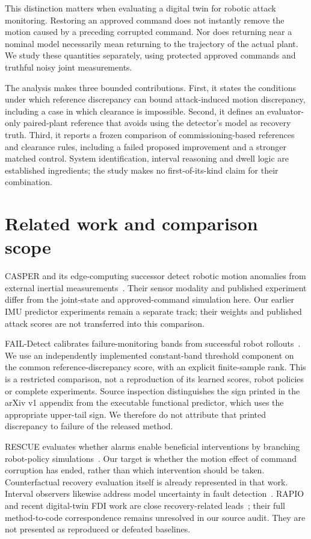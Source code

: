 \documentclass[11pt]{article}
\begin{document}
This distinction matters when evaluating a digital twin for robotic attack monitoring. Restoring an approved command does not instantly remove the motion caused by a preceding corrupted command. Nor does returning near a nominal model necessarily mean returning to the trajectory of the actual plant. We study these quantities separately, using protected approved commands and truthful noisy joint measurements.

The analysis makes three bounded contributions. First, it states the conditions under which reference discrepancy can bound attack-induced motion discrepancy, including a case in which clearance is impossible. Second, it defines an evaluator-only paired-plant reference that avoids using the detector's model as recovery truth. Third, it reports a frozen comparison of commissioning-based references and clearance rules, including a failed proposed improvement and a stronger matched control. System identification, interval reasoning and dwell logic are established ingredients; the study makes no first-of-its-kind claim for their combination.

\section{Related work and comparison scope}
CASPER and its edge-computing successor detect robotic motion anomalies from external inertial measurements~\cite{casper,edge}. Their sensor modality and published experiment differ from the joint-state and approved-command simulation here. Our earlier IMU predictor experiments remain a separate track; their weights and published attack scores are not transferred into this comparison.

FAIL-Detect calibrates failure-monitoring bands from successful robot rollouts~\cite{fail}. We use an independently implemented constant-band threshold component on the common reference-discrepancy score, with an explicit finite-sample rank. This is a restricted comparison, not a reproduction of its learned scores, robot policies or complete experiments. Source inspection distinguishes the sign printed in the arXiv v1 appendix from the executable functional predictor, which uses the appropriate upper-tail sign. We therefore do not attribute that printed discrepancy to failure of the released method.

RESCUE evaluates whether alarms enable beneficial interventions by branching robot-policy simulations~\cite{rescue}. Our target is whether the motion effect of command corruption has ended, rather than which intervention should be taken. Counterfactual recovery evaluation itself is already represented in that work. Interval observers likewise address model uncertainty in fault detection~\cite{interval}. RAPIO and recent digital-twin FDI work are close recovery-related leads~\cite{rapio,kaisar}; their full method-to-code correspondence remains unresolved in our source audit. They are not presented as reproduced or defeated baselines.
\end{document}
